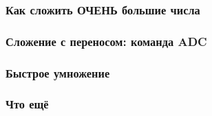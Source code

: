 \documentclass[pdf,9pt,aspectratio=169]{beamer}
\begin{document}
\begin{frame}[fragile]\frametitle{Как сложить ОЧЕНЬ большие числа}
\end{frame}

\begin{frame}[fragile]\frametitle{Сложение с переносом: команда ADC}
\end{frame}

\begin{frame}[fragile]\frametitle{Быстрое умножение}
\end{frame}

\begin{frame}[fragile]\frametitle{Что ещё}
\end{frame}
\end{document}
